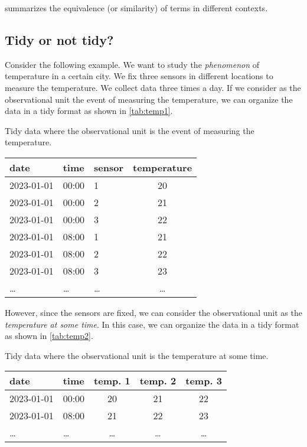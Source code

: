  summarizes the equivalence (or similarity) of terms in different
contexts.

\subsection{Tidy or not tidy?}
\label{sub:tidy-not-tidy}

Consider the following example.  We want to study the \emph{phenomenon} of temperature in a
certain city.  We fix three sensors in different locations to measure the temperature.  We
collect data three times a day.  If we consider as the observational unit the
event of measuring the temperature, we can organize the data in a tidy format as shown in
\cref{tab:temp1}.

\begin{tablebox}[label=tab:temp1]{Tidy data where the observational unit is the event of measuring the temperature.}
  \centering
  \begin{tabular}{lllc}
    \toprule
    \textbf{date} & \textbf{time} & \textbf{sensor} & \textbf{temperature} \\
    \midrule
    2023-01-01 & 00:00 & 1 & 20 \\
    2023-01-01 & 00:00 & 2 & 21 \\
    2023-01-01 & 00:00 & 3 & 22 \\
    2023-01-01 & 08:00 & 1 & 21 \\
    2023-01-01 & 08:00 & 2 & 22 \\
    2023-01-01 & 08:00 & 3 & 23 \\
    \dots & \dots & \dots & \dots \\
    \bottomrule
  \end{tabular}
\end{tablebox}

However, since the sensors are fixed, we can consider the observational unit as the
\emph{temperature at some time}.  In this case, we can organize the data in a tidy format
as shown in \cref{tab:temp2}.

\begin{tablebox}[label=tab:temp2]{Tidy data where the observational unit is the temperature at some time.}
  \centering
  \begin{tabular}{llccc}
    \toprule
    \textbf{date} & \textbf{time} & \textbf{temp. 1} & \textbf{temp. 2} & \textbf{temp. 3} \\
    \midrule
    2023-01-01 & 00:00 & 20 & 21 & 22 \\
    2023-01-01 & 08:00 & 21 & 22 & 23 \\
    \dots & \dots & \dots & \dots & \dots \\
    \bottomrule
  \end{tabular}
\end{tablebox}

